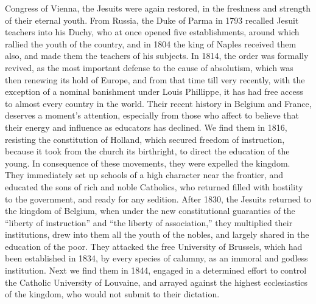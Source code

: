 \documentclass[]{book}
\begin{document}
Congress of Vienna, the Jesuits were again restored, in the freshness and strength of their eternal youth. From Russia, the Duke of Parma in 1793 recalled Jesuit teachers into his Duchy, who at once opened five establishments, around which rallied the youth of the country, and in 1804 the king of Naples received them also, and made them the teachers of his subjects. In 1814, the order was formally revived, as the most important defense to the cause of absolutism, which was then renewing its hold of Europe, and from that time till very recently, with the exception of a nominal banishment under Louis Phillippe, it has had free access to almost every country in the world. Their recent history in Belgium and France, deserves a moment's attention, especially from those who affect to believe that their energy and influence as educators has declined. We find them in 1816, resisting the constitution of Holland, which secured freedom of instruction, because it took from the church its birthright, to direct the education of the young. In consequence of these movements, they were expelled the kingdom. They immediately set up schools of a high character near the frontier, and educated the sons of rich and noble Catholics, who returned filled with hostility to the government, and ready for any sedition. After 1830, the Jesuits returned to the kingdom of Belgium, when under the new constitutional guaranties of the ``liberty of instruction'' and ``the liberty of association,'' they multiplied their institutions, drew into them all the youth of the nobles, and largely shared in the education of the poor. They attacked the free University of Brussels, which had been established in 1834, by every species of calumny, as an immoral and godless institution. Next we find them in 1844, engaged in a determined effort to control the Catholic University of Louvaine, and arrayed against the highest ecclesiastics of the kingdom, who would not submit to their dictation.
\end{document}
